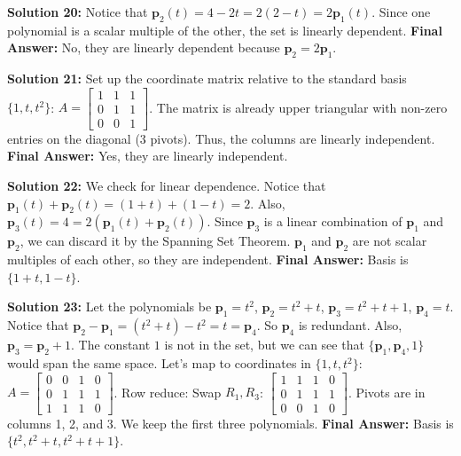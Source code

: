 \documentclass[11pt]{article}
\begin{document}
\vspace{0.5cm}
\textbf{Solution 20:}
Notice that $\mathbf{p}_2(t) = 4 - 2t = 2(2 - t) = 2\mathbf{p}_1(t)$. Since one polynomial is a scalar multiple of the other, the set is linearly dependent.
\textbf{Final Answer:} No, they are linearly dependent because $\mathbf{p}_2 = 2\mathbf{p}_1$.

\vspace{0.5cm}
\textbf{Solution 21:}
Set up the coordinate matrix relative to the standard basis $\{1, t, t^2\}$:
$A = \begin{bmatrix} 1 & 1 & 1 \\ 0 & 1 & 1 \\ 0 & 0 & 1 \end{bmatrix}$.
The matrix is already upper triangular with non-zero entries on the diagonal (3 pivots). Thus, the columns are linearly independent.
\textbf{Final Answer:} Yes, they are linearly independent.

\vspace{0.5cm}
\textbf{Solution 22:}
We check for linear dependence. Notice that $\mathbf{p}_1(t) + \mathbf{p}_2(t) = (1+t) + (1-t) = 2$.
Also, $\mathbf{p}_3(t) = 4 = 2(\mathbf{p}_1(t) + \mathbf{p}_2(t))$.
Since $\mathbf{p}_3$ is a linear combination of $\mathbf{p}_1$ and $\mathbf{p}_2$, we can discard it by the Spanning Set Theorem. $\mathbf{p}_1$ and $\mathbf{p}_2$ are not scalar multiples of each other, so they are independent.
\textbf{Final Answer:} Basis is $\{1+t, 1-t\}$.

\vspace{0.5cm}
\textbf{Solution 23:}
Let the polynomials be $\mathbf{p}_1 = t^2$, $\mathbf{p}_2 = t^2+t$, $\mathbf{p}_3 = t^2+t+1$, $\mathbf{p}_4 = t$.
Notice that $\mathbf{p}_2 - \mathbf{p}_1 = (t^2+t) - t^2 = t = \mathbf{p}_4$. So $\mathbf{p}_4$ is redundant.
Also, $\mathbf{p}_3 = \mathbf{p}_2 + 1$. The constant $1$ is not in the set, but we can see that $\{\mathbf{p}_1, \mathbf{p}_4, 1\}$ would span the same space. Let's map to coordinates in $\{1, t, t^2\}$:
$A = \begin{bmatrix} 0 & 0 & 1 & 0 \\ 0 & 1 & 1 & 1 \\ 1 & 1 & 1 & 0 \end{bmatrix}$.
Row reduce: Swap $R_1, R_3$: $\begin{bmatrix} 1 & 1 & 1 & 0 \\ 0 & 1 & 1 & 1 \\ 0 & 0 & 1 & 0 \end{bmatrix}$.
Pivots are in columns 1, 2, and 3. We keep the first three polynomials.
\textbf{Final Answer:} Basis is $\{t^2, t^2+t, t^2+t+1\}$.
\end{document}
